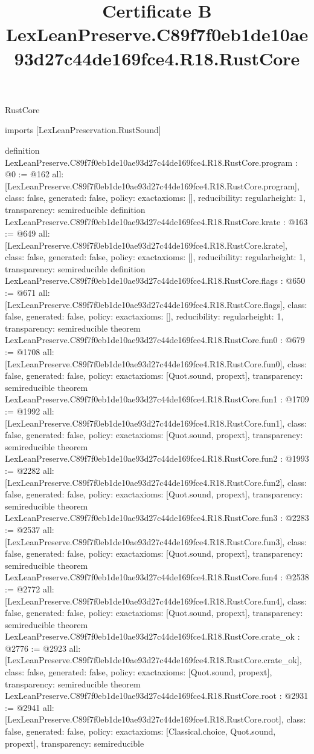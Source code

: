 \begin{lexlean}{RustCore}
\title{Certificate B LexLeanPreserve.C89f7f0eb1de10ae93d27c44de169fce4.R18.RustCore}
\begin{coremodule}
imports [LexLeanPreservation.RustSound]

definition LexLeanPreserve.C89f7f0eb1de10ae93d27c44de169fce4.R18.RustCore.program : @0 := @162 {
  all: [LexLeanPreserve.C89f7f0eb1de10ae93d27c44de169fce4.R18.RustCore.program],
  class: false,
  generated: false,
  policy: exact{axioms: []},
  reducibility: regular{height: 1},
  transparency: semireducible
}
definition LexLeanPreserve.C89f7f0eb1de10ae93d27c44de169fce4.R18.RustCore.krate : @163 := @649 {
  all: [LexLeanPreserve.C89f7f0eb1de10ae93d27c44de169fce4.R18.RustCore.krate],
  class: false,
  generated: false,
  policy: exact{axioms: []},
  reducibility: regular{height: 1},
  transparency: semireducible
}
definition LexLeanPreserve.C89f7f0eb1de10ae93d27c44de169fce4.R18.RustCore.flags : @650 := @671 {
  all: [LexLeanPreserve.C89f7f0eb1de10ae93d27c44de169fce4.R18.RustCore.flags],
  class: false,
  generated: false,
  policy: exact{axioms: []},
  reducibility: regular{height: 1},
  transparency: semireducible
}
theorem LexLeanPreserve.C89f7f0eb1de10ae93d27c44de169fce4.R18.RustCore.fun0 : @679 := @1708 {
  all: [LexLeanPreserve.C89f7f0eb1de10ae93d27c44de169fce4.R18.RustCore.fun0],
  class: false,
  generated: false,
  policy: exact{axioms: [Quot.sound, propext]},
  transparency: semireducible
}
theorem LexLeanPreserve.C89f7f0eb1de10ae93d27c44de169fce4.R18.RustCore.fun1 : @1709 := @1992 {
  all: [LexLeanPreserve.C89f7f0eb1de10ae93d27c44de169fce4.R18.RustCore.fun1],
  class: false,
  generated: false,
  policy: exact{axioms: [Quot.sound, propext]},
  transparency: semireducible
}
theorem LexLeanPreserve.C89f7f0eb1de10ae93d27c44de169fce4.R18.RustCore.fun2 : @1993 := @2282 {
  all: [LexLeanPreserve.C89f7f0eb1de10ae93d27c44de169fce4.R18.RustCore.fun2],
  class: false,
  generated: false,
  policy: exact{axioms: [Quot.sound, propext]},
  transparency: semireducible
}
theorem LexLeanPreserve.C89f7f0eb1de10ae93d27c44de169fce4.R18.RustCore.fun3 : @2283 := @2537 {
  all: [LexLeanPreserve.C89f7f0eb1de10ae93d27c44de169fce4.R18.RustCore.fun3],
  class: false,
  generated: false,
  policy: exact{axioms: [Quot.sound, propext]},
  transparency: semireducible
}
theorem LexLeanPreserve.C89f7f0eb1de10ae93d27c44de169fce4.R18.RustCore.fun4 : @2538 := @2772 {
  all: [LexLeanPreserve.C89f7f0eb1de10ae93d27c44de169fce4.R18.RustCore.fun4],
  class: false,
  generated: false,
  policy: exact{axioms: [Quot.sound, propext]},
  transparency: semireducible
}
theorem LexLeanPreserve.C89f7f0eb1de10ae93d27c44de169fce4.R18.RustCore.crate_ok : @2776 := @2923 {
  all: [LexLeanPreserve.C89f7f0eb1de10ae93d27c44de169fce4.R18.RustCore.crate_ok],
  class: false,
  generated: false,
  policy: exact{axioms: [Quot.sound, propext]},
  transparency: semireducible
}
theorem LexLeanPreserve.C89f7f0eb1de10ae93d27c44de169fce4.R18.RustCore.root : @2931 := @2941 {
  all: [LexLeanPreserve.C89f7f0eb1de10ae93d27c44de169fce4.R18.RustCore.root],
  class: false,
  generated: false,
  policy: exact{axioms: [Classical.choice, Quot.sound, propext]},
  transparency: semireducible
}


\end{coremodule}
\end{lexlean}
